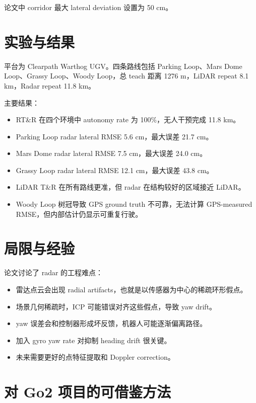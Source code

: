 \documentclass[UTF8,a4paper,12pt]{ctexrep}
\begin{document}
论文中 corridor 最大 lateral deviation 设置为 50 cm。

\section{实验与结果}

平台为 Clearpath Warthog UGV。四条路线包括 Parking Loop、Mars Dome Loop、Grassy Loop、Woody Loop，总 teach 距离 1276 m，LiDAR repeat 8.1 km，Radar repeat 11.8 km。

主要结果：

\begin{itemize}
  \item RT\&R 在四个环境中 autonomy rate 为 100\%，无人干预完成 11.8 km。
  \item Parking Loop radar lateral RMSE 5.6 cm，最大误差 21.7 cm。
  \item Mars Dome radar lateral RMSE 7.5 cm，最大误差 24.0 cm。
  \item Grassy Loop radar lateral RMSE 12.1 cm，最大误差 43.8 cm。
  \item LiDAR T\&R 在所有路线更准，但 radar 在结构较好的区域接近 LiDAR。
  \item Woody Loop 树冠导致 GPS ground truth 不可靠，无法计算 GPS-measured RMSE，但内部估计仍显示可重复行驶。
\end{itemize}

\section{局限与经验}

论文讨论了 radar 的工程难点：

\begin{itemize}
  \item 雷达点云会出现 radial artifacts，也就是以传感器为中心的稀疏环形假点。
  \item 场景几何稀疏时，ICP 可能错误对齐这些假点，导致 yaw drift。
  \item yaw 误差会和控制器形成坏反馈，机器人可能逐渐偏离路径。
  \item 加入 gyro yaw rate 对抑制 heading drift 很关键。
  \item 未来需要更好的点特征提取和 Doppler correction。
\end{itemize}

\section{对 Go2 项目的可借鉴方法}
\end{document}
